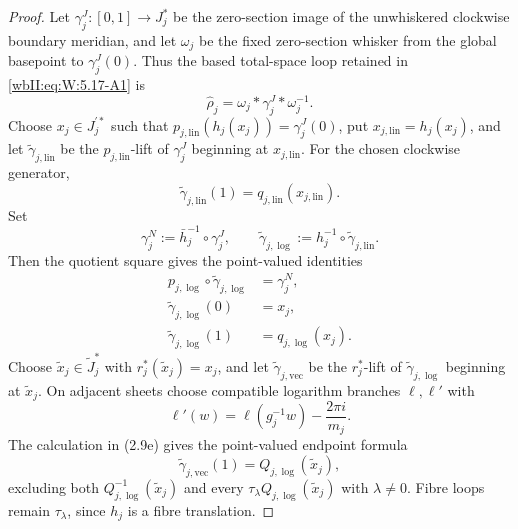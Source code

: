 \begin{proof}
Let \(\gamma_j^J:[0,1]\to J_j^*\) be the zero-section image of the
unwhiskered clockwise boundary meridian, and let \(\omega_j\) be the fixed
zero-section whisker from the global basepoint to \(\gamma_j^J(0)\).  Thus
the based total-space loop retained in \eqref{wbII:eq:W:5.17-A1} is
\[
 \widehat\rho_j=\omega_j*\gamma_j^J*\omega_j^{-1}.
\]
Choose \(x_j\in J_j^{\prime *}\) such that
\(p_{j,\mathrm{lin}}(h_j(x_j))=\gamma_j^J(0)\), put
\(x_{j,\mathrm{lin}}=h_j(x_j)\), and let
\(\widetilde\gamma_{j,\mathrm{lin}}\) be the
\(p_{j,\mathrm{lin}}\)-lift of \(\gamma_j^J\) beginning at
\(x_{j,\mathrm{lin}}\).  For the chosen clockwise generator,
\[
 \widetilde\gamma_{j,\mathrm{lin}}(1)
 =q_{j,\mathrm{lin}}(x_{j,\mathrm{lin}}).
\]
Set
\[
 \gamma_j^N:=\bar h_j^{-1}\circ\gamma_j^J,
 \qquad
 \widetilde\gamma_{j,\log}
 :=h_j^{-1}\circ\widetilde\gamma_{j,\mathrm{lin}}.
\]
Then the quotient square gives the point-valued identities
\[
\begin{aligned}
 p_{j,\log}\circ\widetilde\gamma_{j,\log}
  &=\gamma_j^N,\\
 \widetilde\gamma_{j,\log}(0)&=x_j,\\
 \widetilde\gamma_{j,\log}(1)&=q_{j,\log}(x_j).
\end{aligned}
\]
Choose \(\widetilde x_j\in\widetilde J_j^*\) with
\(r_j^*(\widetilde x_j)=x_j\), and let
\(\widetilde\gamma_{j,\mathrm{vec}}\) be the \(r_j^*\)-lift of
\(\widetilde\gamma_{j,\log}\) beginning at \(\widetilde x_j\).  On
adjacent sheets choose compatible logarithm branches \(\ell,\ell'\) with
\[
 \ell'(w)=\ell(g_j^{-1}w)-\frac{2\pi i}{m_j}.
\]
The calculation in (2.9e) gives the point-valued endpoint formula
\[
 \widetilde\gamma_{j,\mathrm{vec}}(1)
 =Q_{j,\log}(\widetilde x_j),
\]
excluding both \(Q_{j,\log}^{-1}(\widetilde x_j)\) and every
\(\tau_\lambda Q_{j,\log}(\widetilde x_j)\) with \(\lambda\ne0\).
Fibre loops remain \(\tau_\lambda\), since \(h_j\) is a fibre translation.


\end{proof}
